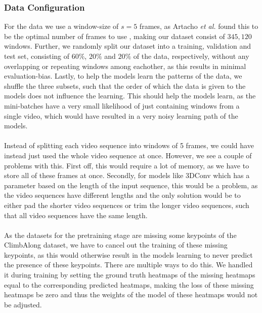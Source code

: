 \documentclass[./main.tex]{subfiles}
\begin{document}
\subsubsection{Data Configuration} For the data we use a window-size of $s = 5$ frames, as Artacho \textit{et al.} found this to be the optimal number of frames to use \cite{https://doi.org/10.48550/arxiv.2001.08095}, making our dataset consist of $345,120$ windows. Further, we randomly split our dataset into a training, validation and test set, consisting of $60\%$, $20\%$ and $20\%$ of the data, respectively, without any overlapping or repeating windows among eachother, as this results in minimal evaluation-bias. Lastly, to help the models learn the patterns of the data, we shuffle the three subsets, such that the order of which the data is given to the models does not influence the learning. This should help the models learn, as the mini-batches have a very small likelihood of just containing windows from a single video, which would have resulted in a very noisy learning path of the models.
\\
\\
Instead of splitting each video sequence into windows of 5 frames, we could have instead just used the whole video sequence at once. However, we see a couple of problems with this. First off, this would require a lot of memory, as we have to store all of these frames at once. Secondly, for models like 3DConv which has a parameter based on the length of the input sequence, this would be a problem, as the video sequences have different lengths and the only solution would be to either pad the shorter video sequences or trim the longer video sequences, such that all video sequences have the same length.
\\
\\
As the datasets for the pretraining stage are missing some keypoints of the ClimbAlong dataset, we have to cancel out the training of these missing keypoints, as this would otherwise result in the models learning to never predict the presence of these keypoints. There are multiple ways to do this. We handled it during training by setting the ground truth heatmaps of the missing heatmaps equal to the corresponding predicted heatmaps, making the loss of these missing heatmaps be zero and thus the weights of the model of these heatmaps would not be adjusted. 
\end{document}
